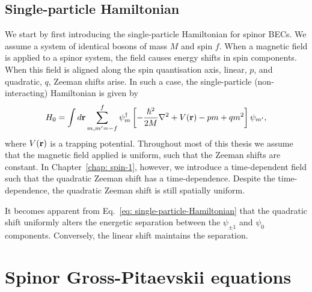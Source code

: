 \subsection{Single-particle Hamiltonian}
We start by first introducing the single-particle Hamiltonian for spinor BECs.
We assume a system of identical bosons of mass \(M\) and spin \(f\).
When a magnetic field is applied to a spinor system, the field causes energy
shifts in spin components.
When this field is aligned along the spin quantisation axis, linear, \(p\), and
quadratic, \(q\), Zeeman shifts arise.
In such a case, the single-particle (non-interacting) Hamiltonian is given
by~\cite{Kawaguchi2012}
\begin{equation}\label{eq: single-particle-Hamiltonian}
    H_0 = \int d\vb{r}\sum_{m,m'=-f}^{f} \psi_m^\dagger \left[
        -\frac{\hbar^2}{2M}\nabla^2 + V(\vb{r}) - pm + qm^2\right]\psi_{m'},
\end{equation}
where \(V(\vb{r})\) is a trapping potential.
Throughout most of this thesis we assume that the magnetic field applied is
uniform, such that the Zeeman shifts are constant.
In Chapter~\ref{chap: spin-1}, however, we introduce a time-dependent field
such that the quadratic Zeeman shift has a time-dependence.
Despite the time-dependence, the quadratic Zeeman shift is still spatially
uniform.

It becomes apparent from Eq.~\eqref{eq: single-particle-Hamiltonian} that the
quadratic shift uniformly alters the energetic separation between the
\(\psi_{\pm 1}\) and \(\psi_0\) components.
Conversely, the linear shift maintains the separation.

\section{Spinor Gross-Pitaevskii equations}

